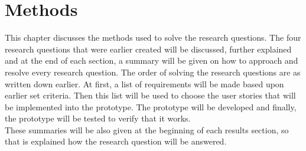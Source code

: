 \documentclass[paper=a4, fontsize=11pt,twoside]{scrartcl}	%
\begin{document}
\section{Methods}
This chapter discusses the methods used to solve the research questions. The four research questions that were earlier created will be discussed, further explained and at the end of each section, a summary will be given on how to approach and resolve every research question. The order of solving the research questions are as written down earlier. At first, a list of requirements will be made based upon earlier set criteria. Then this list will be used to choose the user stories that will be implemented into the prototype. The prototype will be developed and finally, the prototype will be tested to verify that it works. \\
These summaries will be also given at the beginning of each results section, so that is explained how the research question will be answered.

\newpage
\end{document}
